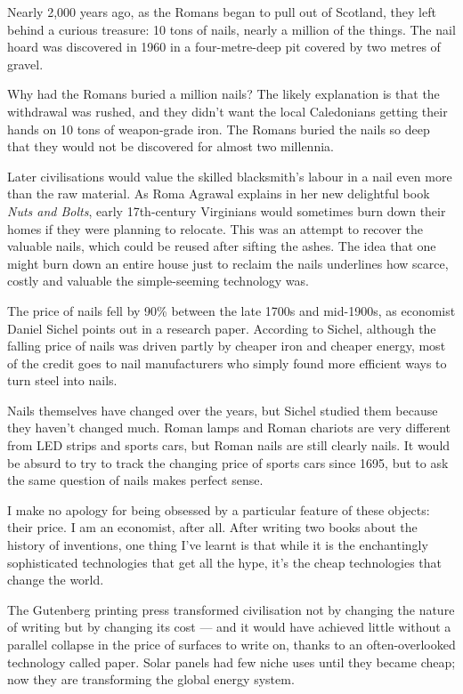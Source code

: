 \documentclass[UTF8,11pt]{ctexart}
\begin{document}
Nearly 2,000 years ago, as the Romans began to pull out of Scotland, they left behind a curious treasure: 10 tons of nails, nearly a million of the things. The nail hoard was discovered in 1960 in a four-metre-deep pit covered by two metres of gravel.


Why had the Romans buried a million nails? The likely explanation is that the withdrawal was rushed, and they didn’t want the local Caledonians getting their hands on 10 tons of weapon-grade iron. The Romans buried the nails so deep that they would not be discovered for almost two millennia.


Later civilisations would value the skilled blacksmith’s labour in a nail even more than the raw material. As Roma Agrawal explains in her new delightful book \textit{Nuts and Bolts}, early 17th-century Virginians would sometimes burn down their homes if they were planning to relocate. This was an attempt to recover the valuable nails, which could be reused after sifting the ashes. The idea that one might burn down an entire house just to reclaim the nails underlines how scarce, costly and valuable the simple-seeming technology was.


The price of nails fell by 90\% between the late 1700s and mid-1900s, as economist Daniel Sichel points out in a research paper. According to Sichel, although the falling price of nails was driven partly by cheaper iron and cheaper energy, most of the credit goes to nail manufacturers who simply found more efficient ways to turn steel into nails.


Nails themselves have changed over the years, but Sichel studied them because they haven’t changed much. Roman lamps and Roman chariots are very different from LED strips and sports cars, but Roman nails are still clearly nails. It would be absurd to try to track the changing price of sports cars since 1695, but to ask the same question of nails makes perfect sense.


I make no apology for being obsessed by a particular feature of these objects: their price. I am an economist, after all. After writing two books about the history of inventions, one thing I’ve learnt is that while it is the enchantingly sophisticated technologies that get all the hype, it’s the cheap technologies that change the world.


The Gutenberg printing press transformed civilisation not by changing the nature of writing but by changing its cost — and it would have achieved little without a parallel collapse in the price of surfaces to write on, thanks to an often-overlooked technology called paper. Solar panels had few niche uses until they became cheap; now they are transforming the global energy system.
\end{document}
